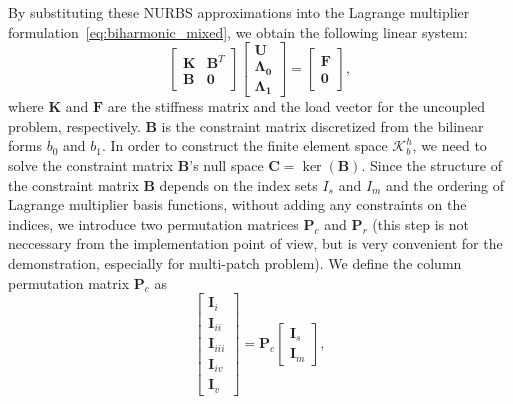 \documentclass[preprint,12pt]{elsarticle}
\begin{document}
By substituting these NURBS approximations into the Lagrange multiplier formulation~\eqref{eq:biharmonic_mixed}, we obtain the following linear system:
\begin{equation}
    \begin{bmatrix}
        \mathbf{K} & \mathbf{B}^T\\
        \mathbf{B} & \mathbf{0}
    \end{bmatrix}
    \begin{bmatrix}
        \mathbf{U}\\
        \mathbf{\Lambda_0}\\
        \mathbf{\Lambda_1}
    \end{bmatrix}=
    \begin{bmatrix}
        \mathbf{F}\\
        \mathbf{0}
    \end{bmatrix},\label{eq:lagrange_multiplier_dicretize}
\end{equation}
where $\mathbf{K}$ and $\mathbf{F}$ are the stiffness matrix and the load vector for the uncoupled problem, respectively. $\mathbf{B}$ is the constraint matrix discretized from the bilinear forms $b_0$ and $b_1$. In order to construct the finite element space $\mathcal{K}_b^h$, we need to solve the constraint matrix $\mathbf{B}$'s null space $\mathbf{C}=\ker(\mathbf{B})$. Since the structure of the constraint matrix $\mathbf{B}$ depends on the index sets $I_s$ and $I_m$ and the ordering of Lagrange multiplier basis functions, without adding any constraints on the indices, we introduce two permutation matrices $\mathbf{P}_c$ and $\mathbf{P}_r$ (this step is not neccessary from the implementation point of view, but is very convenient for the demonstration, especially for multi-patch problem). We define the column permutation matrix $\mathbf{P}_c$ as
\begin{equation}
    \begin{bmatrix}
        \mathbf{I}_{i}\\
        \mathbf{I}_{ii}\\
        \mathbf{I}_{iii}\\
        \mathbf{I}_{iv}\\
        \mathbf{I}_{v}
    \end{bmatrix}=
    \mathbf{P}_c
    \begin{bmatrix}
        \mathbf{I}_s\\
        \mathbf{I}_m
    \end{bmatrix},
\end{equation}
\end{document}
